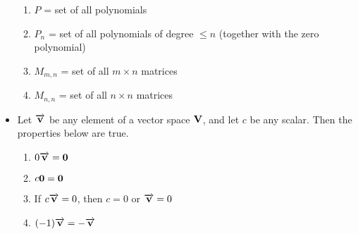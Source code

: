 \documentclass[12pt]{article}
\begin{document}
\begin{itemize}
\begin{enumerate}
      \item $P$ = set of all polynomials

      \item $P_n$ = set of all polynomials of degree $\leq n$ (together with the zero polynomial)

      \item $M_{m,n}$ = set of all $m\times n$ matrices

      \item $M_{n,n}$ = set of all $n\times n$ matrices

    \end{enumerate}

  \item Let $\overrightarrow{\bold{v}}$ be any element of a vector space $\bold{V}$, and let $c$ be any scalar. Then the properties below are true.

    \begin{enumerate}

      \item $0\overrightarrow{\bold{v}}=\bold{0}$

      \item $c\bold{0}=\bold{0}$

      \item If $c\overrightarrow{\bold{v}}=0$, then $c=0$ or $\overrightarrow{\bold{v}}=0$

      \item $(-1)\overrightarrow{\bold{v}}=-\overrightarrow{\bold{v}}$

    \end{enumerate}

\end{itemize}
\end{document}
